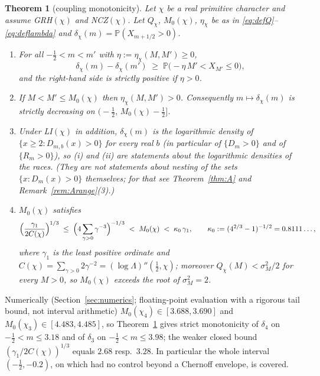 \documentclass[11pt]{amsart}
\newtheorem{letterthm}{Theorem}
\theoremstyle{definition}
\numberwithin{equation}{section}
\newcommand{\PP}{\mathbb P}
\begin{document}
\begin{letterthm}[coupling monotonicity]\label{thm:B}
Let $\chi$ be a real primitive character and assume GRH$(\chi)$ and
NCZ$(\chi)$. Let $Q_\chi$, $M_0(\chi)$, $\eta_\chi$ be as in
\eqref{eq:defQ}--\eqref{eq:deflambda} and
$\delta_\chi(m)=\PP(X_{m+1/2}>0)$.
\begin{enumerate}
\item[(i)] For all $-\tfrac12<m<m'$ with $\eta:=\eta_\chi(M,M')\ge0$,
\[
\delta_\chi(m)-\delta_\chi(m')\;\ge\;
\PP\bigl(-\eta\,M'<X_{M'}\le0\bigr),
\]
and the right-hand side is strictly positive if $\eta>0$.
\item[(ii)] If $M<M'\le M_0(\chi)$ then $\eta_\chi(M,M')>0$.
Consequently $m\mapsto\delta_\chi(m)$ is strictly decreasing on
$\bigl(-\tfrac12,\,M_0(\chi)-\tfrac12\bigr]$.
\item[(iii)] Under LI$(\chi)$ in addition, $\delta_\chi(m)$ is the
logarithmic density of $\{x\ge2:D_{m,b}(x)>0\}$ for every real $b$
(in particular of $\{D_m>0\}$ and of $\{R_m>0\}$), so (i) and (ii)
are statements about the logarithmic densities of the races. (They
are not statements about nesting of the sets $\{x:D_m(x)>0\}$
themselves; for that see Theorem~\ref{thm:A} and
Remark~\ref{rem:Arange}(3).)
\item[(iv)] $M_0(\chi)$ satisfies
\[
\Bigl(\frac{\gamma_1}{2C(\chi)}\Bigr)^{1/3}
\;\le\;\Bigl(4\sum_{\gamma>0}\gamma^{-3}\Bigr)^{-1/3}
\;<\;M_0(\chi)\;<\;\kappa_0\,\gamma_1,
\qquad \kappa_0:=(4^{2/3}-1)^{-1/2}=0.8111\ldots,
\]
where $\gamma_1$ is the least positive ordinate and
$C(\chi)=\sum_{\gamma>0}2\gamma^{-2}=(\log\Lambda)''(\tfrac12,\chi)$;
moreover $Q_\chi(M)<\sigma_M^2/2$ for every $M>0$, so
$M_0(\chi)$ exceeds the root of $\sigma_M^2=2$.
\end{enumerate}
\end{letterthm}

Numerically (Section~\ref{sec:numerics}; floating-point evaluation
with a rigorous tail bound, not interval arithmetic)
$M_0(\chi_4)\in[3.688,3.690]$ and $M_0(\chi_3)\in[4.483,4.485]$, so
Theorem~\ref{thm:B} gives strict monotonicity of $\delta_4$ on
$-\tfrac12<m\le3.18$ and of $\delta_3$ on $-\tfrac12<m\le3.98$; the
weaker closed bound $(\gamma_1/2C(\chi))^{1/3}$ equals $2.68$ resp.\
$3.28$. In particular the whole interval $(-\tfrac12,-0.2)$, on which
\cite{WR} had no control beyond a Chernoff envelope, is covered.
\end{document}

